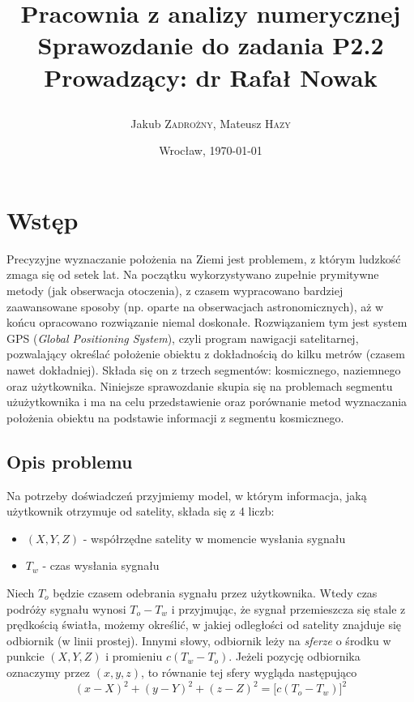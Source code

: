 \documentclass{article}
\title{\LARGE\textbf{Pracownia z analizy numerycznej} \\ Sprawozdanie do zadania \textbf{P2.2} \\
\vskip 0.2cm \large Prowadzący: dr Rafał Nowak\\
\author{ Jakub \textsc{Zadrożny}, Mateusz \textsc{Hazy}}}
\date{Wrocław, \today}
\begin{document}
\maketitle

\section{Wstęp}
Precyzyjne wyznaczanie położenia na Ziemi jest problemem, z którym ludzkość zmaga się od setek lat.
Na początku wykorzystywano zupełnie prymitywne metody (jak obserwacja otoczenia), z czasem wypracowano bardziej
zaawansowane sposoby (np. oparte na obserwacjach astronomicznych), aż w końcu opracowano rozwiązanie niemal doskonałe.
Rozwiązaniem tym jest system GPS (\textit{Global Positioning System}), czyli program nawigacji satelitarnej,
pozwalający określać położenie obiektu z dokładnością do kilku metrów (czasem nawet dokładniej).
Składa się on z trzech segmentów: kosmicznego, naziemnego oraz użytkownika. Niniejsze sprawozdanie skupia się na problemach
segmentu użużytkownika i ma na celu przedstawienie oraz porównanie metod wyznaczania położenia obiektu na podstawie
informacji z segmentu kosmicznego.

\subsection{Opis problemu}
Na potrzeby doświadczeń przyjmiemy model, w którym informacja, jaką użytkownik otrzymuje od satelity,
składa się z 4 liczb:
\begin{itemize}
    \item $(X, Y, Z)$ - współrzędne satelity w momencie wysłania sygnału
	\item $T_w$ - czas wysłania sygnału
\end{itemize}
Niech $T_{o}$ będzie czasem odebrania sygnału przez użytkownika. Wtedy czas podróży sygnału wynosi $T_o - T_w$ i
przyjmując, że sygnał przemieszcza się stale z prędkością światła, możemy określić, w jakiej odległości od satelity
znajduje się odbiornik (w linii prostej). Innymi słowy, odbiornik leży na \textit{sferze} o środku w punkcie $(X, Y, Z)$
i promieniu $c(T_w-T_o)$. Jeżeli pozycję odbiornika oznaczymy przez $(x, y, z)$, to równanie tej sfery wygląda następująco
\[
(x - X)^2 + (y - Y)^2 + (z - Z)^2 = \big[c(T_{o} - T_{w})\big]^2
\]
\end{document}
